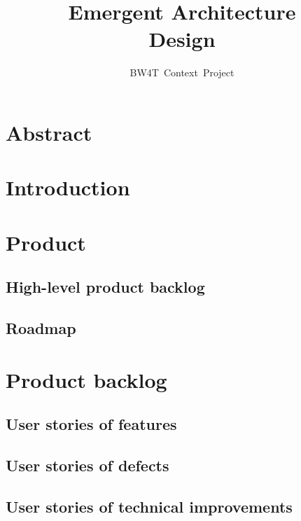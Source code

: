 \documentclass[oneside]{tudelft-report}
\begin{document}
\frontmatter

\title[Blocks World for Teams]{Emergent Architecture\\ Design}
\author{BW4T~Context~Project}
\makecover





\pagebreak
\section*{Abstract}

\pagebreak
\tableofcontents
\pagebreak
\section{Introduction}


\section{Product}
\subsection{High-level product backlog}
\subsection{Roadmap}


\section{Product backlog}
\subsection{User stories of features}


\subsection{User stories of defects}
\subsection{User stories of technical improvements}
%
\end{document}
